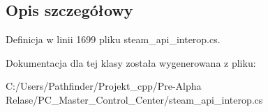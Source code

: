 \subsection{Opis szczegółowy}


Definicja w linii 1699 pliku steam\+\_\+api\+\_\+interop.\+cs.



Dokumentacja dla tej klasy została wygenerowana z pliku\+:\begin{DoxyCompactItemize}
\item 
C\+:/\+Users/\+Pathfinder/\+Projekt\+\_\+cpp/\+Pre-\/\+Alpha Relase/\+P\+C\+\_\+\+Master\+\_\+\+Control\+\_\+\+Center/steam\+\_\+api\+\_\+interop.\+cs\end{DoxyCompactItemize}
